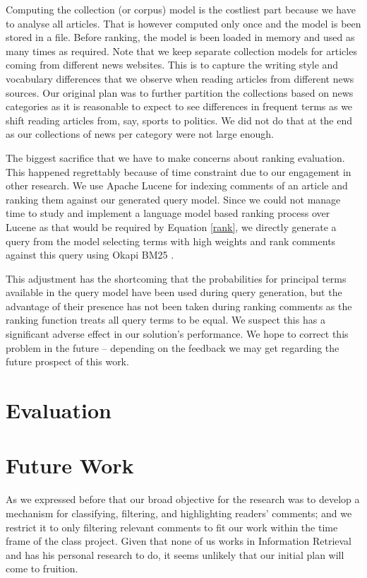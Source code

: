 \documentclass[article]{IEEEtran}
\begin{document}
Computing the collection (or corpus) model is the costliest part because we have to analyse all articles. That is however computed only once and the model is been stored in a file. Before ranking, the model is been loaded in memory and used as many times as required. Note that we keep separate collection models for articles coming from different news websites. This is to capture the writing style and vocabulary differences that we observe when reading articles from different news sources. Our original plan was to further partition the collections based on news categories as it is reasonable to expect to see differences in frequent terms as we shift reading articles from, say, sports to politics. We did not do that at the end as our collections of news per category were not large enough.     

The biggest sacrifice that we have to make concerns about ranking evaluation. This happened regrettably because of time constraint due to our engagement in other research. We use Apache Lucene \cite{McCandless:2010:LAS:1893016} for indexing comments of an article and ranking them against our generated query model. Since we could not manage time to study and implement a language model based ranking process over Lucene as that would be required by Equation \ref{rank}, we directly generate a query from the model selecting terms with high weights and rank comments against this query using Okapi BM25 \cite{Robertson96okapiat}.

This adjustment has the shortcoming that the probabilities for principal terms available in the query model have been used during query generation, but the advantage of their presence has not been taken during ranking comments as the ranking function treats all query terms to be equal. We suspect this has a significant adverse effect in our solution's performance. We hope to correct this problem in the future -- depending on the feedback we may get regarding the future prospect of this work.          

\section{Evaluation}
\label{ev}

\section{Future Work}
\label{fw}
As we expressed before that our broad objective for the research was to develop a mechanism for classifying, filtering, and highlighting readers' comments; and we restrict it to only filtering relevant comments to fit our work within the time frame of the class project. Given that none of us works in Information Retrieval and has his personal research to do, it seems unlikely that our initial plan will come to fruition.
\end{document}
